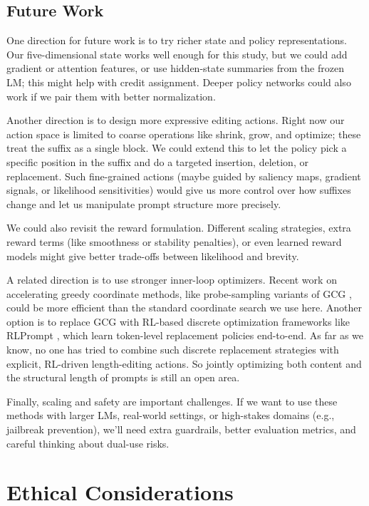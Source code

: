 \documentclass[11pt]{article}
\begin{document}
\subsection{Future Work}
\label{subsec:future}

One direction for future work is to try richer state and policy representations. Our five-dimensional state works well enough for this study, but we could add gradient or attention features, or use hidden-state summaries from the frozen LM; this might help with credit assignment. Deeper policy networks could also work if we pair them with better normalization.

Another direction is to design more expressive editing actions. Right now our action space is limited to coarse operations like shrink, grow, and optimize; these treat the suffix as a single block. We could extend this to let the policy pick a specific position in the suffix and do a targeted insertion, deletion, or replacement. Such fine-grained actions (maybe guided by saliency maps, gradient signals, or likelihood sensitivities) would give us more control over how suffixes change and let us manipulate prompt structure more precisely.

We could also revisit the reward formulation. Different scaling strategies, extra reward terms (like smoothness or stability penalties), or even learned reward models might give better trade-offs between likelihood and brevity.

A related direction is to use stronger inner-loop optimizers. Recent work on accelerating greedy coordinate methods, like probe-sampling variants of GCG \cite{zhao2024accelerating}, could be more efficient than the standard coordinate search we use here. Another option is to replace GCG with RL-based discrete optimization frameworks like RLPrompt \cite{deng2022rlpromptoptimizingdiscretetext}, which learn token-level replacement policies end-to-end. As far as we know, no one has tried to combine such discrete replacement strategies with explicit, RL-driven length-editing actions. So jointly optimizing both content and the structural length of prompts is still an open area.

Finally, scaling and safety are important challenges. If we want to use these methods with larger LMs, real-world settings, or high-stakes domains (e.g., jailbreak prevention), we'll need extra guardrails, better evaluation metrics, and careful thinking about dual-use risks.

\section*{Ethical Considerations}
\end{document}
